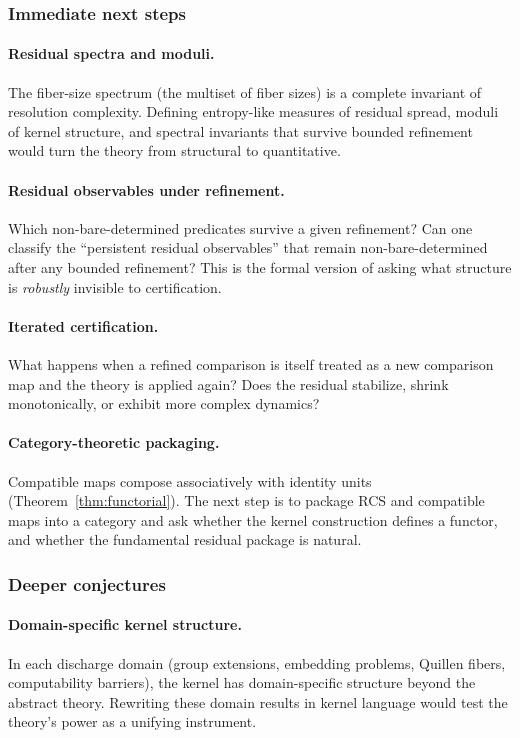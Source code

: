 \documentclass[11pt,a4paper]{article}
\theoremstyle{plain}
\theoremstyle{definition}
\theoremstyle{remark}
\begin{document}
\subsubsection*{Immediate next steps}

\paragraph{Residual spectra and moduli.}
The fiber-size spectrum (the multiset of fiber sizes) is a complete invariant
of resolution complexity. Defining entropy-like measures of residual
spread, moduli of kernel structure, and spectral invariants that survive
bounded refinement would turn the theory from structural to quantitative.

\paragraph{Residual observables under refinement.}
Which non-bare-determined predicates survive a given refinement? Can one
classify the ``persistent residual observables'' that remain non-bare-determined
after any bounded refinement? This is the formal version of asking what
structure is \emph{robustly} invisible to certification.

\paragraph{Iterated certification.}
What happens when a refined comparison is itself treated as a new comparison
map and the theory is applied again? Does the residual stabilize, shrink
monotonically, or exhibit more complex dynamics?

\paragraph{Category-theoretic packaging.}
Compatible maps compose associatively with identity units
(Theorem~\ref{thm:functorial}). The next step is to package RCS and
compatible maps into a category and ask whether the kernel construction
defines a functor, and whether the fundamental residual package is natural.

\subsubsection*{Deeper conjectures}

\paragraph{Domain-specific kernel structure.}
In each discharge domain (group extensions, embedding problems, Quillen
fibers, computability barriers), the kernel has domain-specific structure
beyond the abstract theory. Rewriting these domain results in kernel
language would test the theory's power as a unifying instrument.
\end{document}
